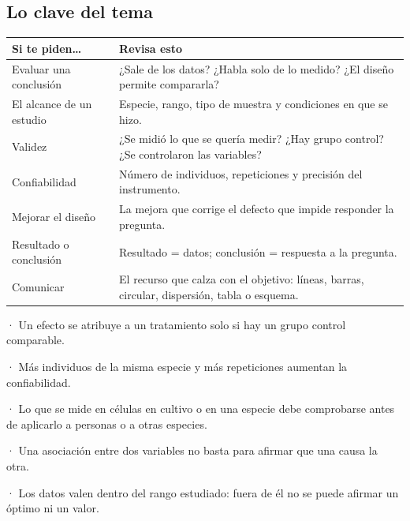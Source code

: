 \subsection{Lo clave del tema}
\begin{center}\small
\begin{tabularx}{\linewidth}{@{}>{\raggedright\arraybackslash\hsize=0.75\hsize}X>{\raggedright\arraybackslash\hsize=1.25\hsize}X@{}}
\toprule
\textbf{Si te piden\dots{}} & \textbf{Revisa esto} \\
\midrule
Evaluar una conclusión & ¿Sale de los datos? ¿Habla solo de lo medido? ¿El diseño permite compararla? \\
El alcance de un estudio & Especie, rango, tipo de muestra y condiciones en que se hizo. \\
Validez & ¿Se midió lo que se quería medir? ¿Hay grupo control? ¿Se controlaron las variables? \\
Confiabilidad & Número de individuos, repeticiones y precisión del instrumento. \\
Mejorar el diseño & La mejora que corrige el defecto que impide responder la pregunta. \\
Resultado o conclusión & Resultado = datos; conclusión = respuesta a la pregunta. \\
Comunicar & El recurso que calza con el objetivo: líneas, barras, circular, dispersión, tabla o esquema. \\
\bottomrule
\end{tabularx}
\end{center}
 
\begin{clave}[{Recuerda}] · Un efecto se atribuye a un tratamiento solo si hay un grupo control comparable.\par · Más individuos de la misma especie y más repeticiones aumentan la confiabilidad.\par · Lo que se mide en células en cultivo o en una especie debe comprobarse antes de aplicarlo a personas o a otras especies.\par · Una asociación entre dos variables no basta para afirmar que una causa la otra.\par · Los datos valen dentro del rango estudiado: fuera de él no se puede afirmar un óptimo ni un valor.\end{clave}
 
